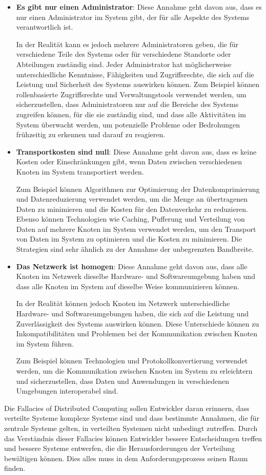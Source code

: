 \documentclass[../vs-script-first-v01.tex]{subfiles}
\begin{document}
\begin{itemize}
\item \textbf{Es gibt nur einen Administrator}: Diese Annahme geht davon aus, dass es nur einen Administrator im System gibt, der für alle Aspekte des Systems verantwortlich ist.

In der Realität kann es jedoch mehrere Administratoren geben, die für verschiedene Teile des Systems oder für verschiedene Standorte oder Abteilungen zuständig sind. Jeder Administrator hat möglicherweise unterschiedliche Kenntnisse, Fähigkeiten und Zugriffsrechte, die sich auf die Leistung und Sicherheit des Systems auswirken können.
Zum Beispiel können rollenbasierte Zugriffsrechte und Verwaltungstools verwendet werden, um sicherzustellen, dass Administratoren nur auf die Bereiche des Systems zugreifen können, für die sie zuständig sind, und dass alle Aktivitäten im System überwacht werden, um potenzielle Probleme oder Bedrohungen frühzeitig zu erkennen und darauf zu reagieren.

\item \textbf{Transportkosten sind null}:
Diese Annahme geht davon aus, dass es keine Kosten oder Einschränkungen gibt, wenn Daten zwischen verschiedenen Knoten im System transportiert werden. 

Zum Beispiel können Algorithmen zur Optimierung der Datenkomprimierung und Datenreduzierung verwendet werden, um die Menge an übertragenen Daten zu minimieren und die Kosten für den Datenverkehr zu reduzieren. Ebenso können Technologien wie Caching, Pufferung und Verteilung von Daten auf mehrere Knoten im System verwendet werden, um den Transport von Daten im System zu optimieren und die Kosten zu minimieren. Die Strategien sind sehr ähnlich zu der Annahme der unbegrenzten Bandbreite. 
\item \textbf{Das Netzwerk ist homogen}: Diese Annahme geht davon aus, dass alle Knoten im Netzwerk dieselbe Hardware- und Softwareumgebung haben und dass alle Knoten im System auf dieselbe Weise kommunizieren können.

In der Realität können jedoch Knoten im Netzwerk unterschiedliche Hardware- und Softwareumgebungen haben, die sich auf die Leistung und Zuverlässigkeit des Systems auswirken können. Diese Unterschiede können zu Inkompatibilitäten und Problemen bei der Kommunikation zwischen Knoten im System führen.

Zum Beispiel können Technologien und Protokollkonvertierung verwendet werden, um die Kommunikation zwischen Knoten im System zu erleichtern und sicherzustellen, dass Daten und Anwendungen in verschiedenen Umgebungen interoperabel sind.
\end{itemize}  
Die Fallacies of Distributed Computing sollen Entwickler daran erinnern, dass verteilte Systeme komplexe Systeme sind und dass bestimmte Annahmen, die für zentrale Systeme gelten, in verteilten Systemen nicht unbedingt zutreffen. Durch das Verständnis dieser Fallacies können Entwickler bessere Entscheidungen treffen und bessere Systeme entwerfen, die die Herausforderungen der Verteilung bewältigen können. Dies alles muss in dem Anforderungsprozess seinen Raum finden.

\label{Woche02}
\end{document}
